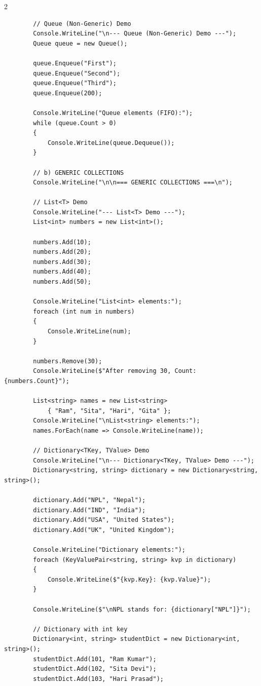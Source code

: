 \documentclass[10pt,a4paper]{article}
\begin{document}
\begin{multicols}{2}
\begin{lstlisting}
        // Queue (Non-Generic) Demo
        Console.WriteLine("\n--- Queue (Non-Generic) Demo ---");
        Queue queue = new Queue();
        
        queue.Enqueue("First");
        queue.Enqueue("Second");
        queue.Enqueue("Third");
        queue.Enqueue(200);
        
        Console.WriteLine("Queue elements (FIFO):");
        while (queue.Count > 0)
        {
            Console.WriteLine(queue.Dequeue());
        }
        
        // b) GENERIC COLLECTIONS
        Console.WriteLine("\n\n=== GENERIC COLLECTIONS ===\n");
        
        // List<T> Demo
        Console.WriteLine("--- List<T> Demo ---");
        List<int> numbers = new List<int>();
        
        numbers.Add(10);
        numbers.Add(20);
        numbers.Add(30);
        numbers.Add(40);
        numbers.Add(50);
        
        Console.WriteLine("List<int> elements:");
        foreach (int num in numbers)
        {
            Console.WriteLine(num);
        }
        
        numbers.Remove(30);
        Console.WriteLine($"After removing 30, Count: {numbers.Count}");
        
        List<string> names = new List<string> 
            { "Ram", "Sita", "Hari", "Gita" };
        Console.WriteLine("\nList<string> elements:");
        names.ForEach(name => Console.WriteLine(name));
        
        // Dictionary<TKey, TValue> Demo
        Console.WriteLine("\n--- Dictionary<TKey, TValue> Demo ---");
        Dictionary<string, string> dictionary = new Dictionary<string, string>();
        
        dictionary.Add("NPL", "Nepal");
        dictionary.Add("IND", "India");
        dictionary.Add("USA", "United States");
        dictionary.Add("UK", "United Kingdom");
        
        Console.WriteLine("Dictionary elements:");
        foreach (KeyValuePair<string, string> kvp in dictionary)
        {
            Console.WriteLine($"{kvp.Key}: {kvp.Value}");
        }
        
        Console.WriteLine($"\nNPL stands for: {dictionary["NPL"]}");
        
        // Dictionary with int key
        Dictionary<int, string> studentDict = new Dictionary<int, string>();
        studentDict.Add(101, "Ram Kumar");
        studentDict.Add(102, "Sita Devi");
        studentDict.Add(103, "Hari Prasad");
        

\end{lstlisting}
\end{multicols}
\end{document}
